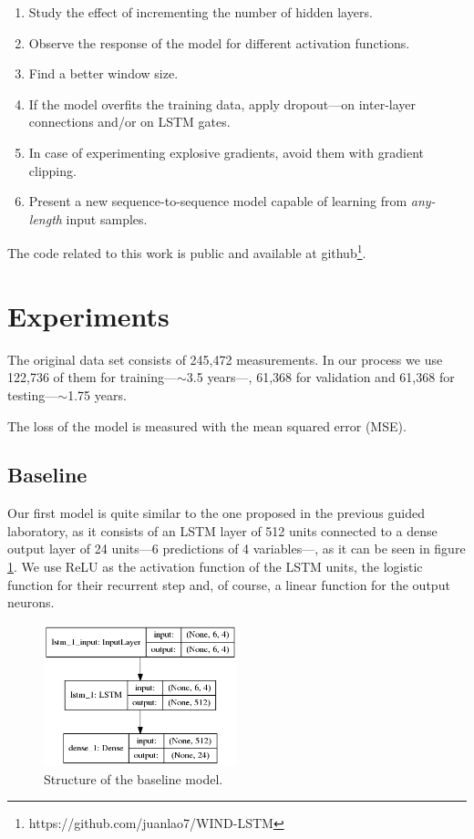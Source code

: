 \documentclass[]{article}
\begin{document}
\begin{enumerate}
	\item Study the effect of incrementing the number of hidden layers.
	\item Observe the response of the model for different activation functions.
	\item Find a better window size.
	\item If the model overfits the training data, apply dropout---on inter-layer connections and/or on LSTM gates.
	\item In case of experimenting explosive gradients, avoid them with gradient clipping.
	\item Present a new sequence-to-sequence model capable of learning from \emph{any-length} input samples.
\end{enumerate}

The code related to this work is public and available at github\footnote{https://github.com/juanlao7/WIND-LSTM}.

\section{Experiments}

The original data set consists of 245,472 measurements. In our process we use 122,736 of them for training---$\sim$3.5 years---, 61,368 for validation and 61,368 for testing---$\sim$1.75 years.

The loss of the model is measured with the mean squared error (MSE).

\subsection{Baseline}

Our first model is quite similar to the one proposed in the previous guided laboratory, as it consists of an LSTM layer of 512 units connected to a dense output layer of 24 units---6 predictions of 4 variables---, as it can be seen in figure \ref{f:model}. We use ReLU as the activation function of the LSTM units, the logistic function for their recurrent step and, of course, a linear function for the output neurons.

\begin{figure}[H]
	\centering
	\includegraphics[width=0.5\textwidth]{model}
	\caption{Structure of the baseline model.}
	\label{f:model}
\end{figure}
\end{document}
